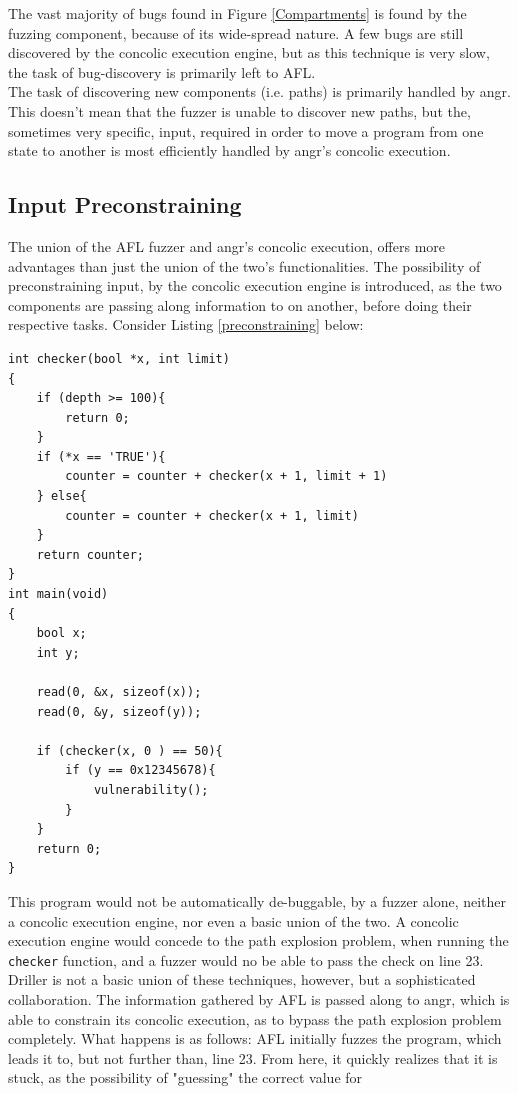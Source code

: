 \documentclass[a4paper]{article}
\newcommand{\ttt}[1]{\texttt{#1}}
\begin{document}
The vast majority of bugs found in Figure \ref{Compartments} is found by the fuzzing component, because of its wide-spread nature. A few bugs are still discovered by the concolic execution engine, but as this technique is very slow, the task of bug-discovery is primarily left to AFL.\\[0.1cm]
The task of discovering new components (i.e. paths) is primarily handled by angr. This doesn't mean that the fuzzer is unable to discover new paths, but the, sometimes very specific, input, required in order to move a program from one state to another is most efficiently handled by angr's concolic execution.
\subsection{Input Preconstraining}
The union of the AFL fuzzer and angr's concolic execution, offers more advantages than just the union of the two's functionalities. The possibility of preconstraining input, by the concolic execution engine is introduced, as the two components are passing along information to on another, before doing their respective tasks. Consider Listing \ref{preconstraining} below:
\newpage
\begin{lstlisting}[caption=A program in need of preconstraining,
label=preconstraining, captionpos=b]
int checker(bool *x, int limit)
{
    if (depth >= 100){
        return 0;
    }
    if (*x == 'TRUE'){
        counter = counter + checker(x + 1, limit + 1)
    } else{
        counter = counter + checker(x + 1, limit)
    }
    return counter;
} 
int main(void)
{
    bool x;
    int y;
    
    read(0, &x, sizeof(x));
    read(0, &y, sizeof(y));

    if (checker(x, 0 ) == 50){
        if (y == 0x12345678){
            vulnerability();
        }
    }	
    return 0;
}
\end{lstlisting}
This program would not be automatically de-buggable, by a fuzzer alone, neither a concolic execution engine, nor even a basic union of the two. A concolic execution engine would concede to the path explosion problem, when running the \ttt{checker} function, and a fuzzer would no be able to pass the check on line 23. Driller is not a basic union of these techniques, however, but a sophisticated collaboration. The information  gathered by AFL is passed along to angr, which is able to constrain its concolic execution, as to bypass the path explosion problem completely. What happens is as follows: AFL initially fuzzes the program, which leads it to, but not further than, line 23. From here, it quickly realizes that it is stuck, as the possibility of "guessing" the correct value for 
\end{document}
